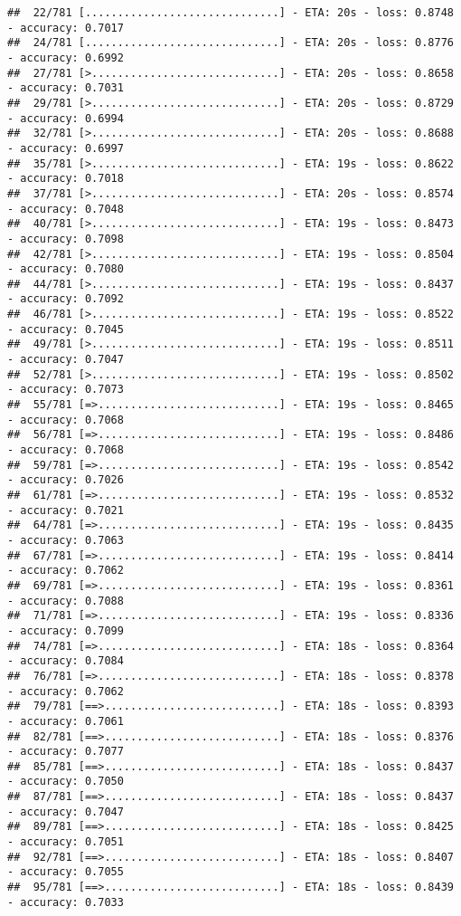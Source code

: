 \documentclass[
]{article}
\begin{document}
\begin{verbatim}
##  22/781 [..............................] - ETA: 20s - loss: 0.8748 - accuracy: 0.7017
##  24/781 [..............................] - ETA: 20s - loss: 0.8776 - accuracy: 0.6992
##  27/781 [>.............................] - ETA: 20s - loss: 0.8658 - accuracy: 0.7031
##  29/781 [>.............................] - ETA: 20s - loss: 0.8729 - accuracy: 0.6994
##  32/781 [>.............................] - ETA: 20s - loss: 0.8688 - accuracy: 0.6997
##  35/781 [>.............................] - ETA: 19s - loss: 0.8622 - accuracy: 0.7018
##  37/781 [>.............................] - ETA: 20s - loss: 0.8574 - accuracy: 0.7048
##  40/781 [>.............................] - ETA: 19s - loss: 0.8473 - accuracy: 0.7098
##  42/781 [>.............................] - ETA: 19s - loss: 0.8504 - accuracy: 0.7080
##  44/781 [>.............................] - ETA: 19s - loss: 0.8437 - accuracy: 0.7092
##  46/781 [>.............................] - ETA: 19s - loss: 0.8522 - accuracy: 0.7045
##  49/781 [>.............................] - ETA: 19s - loss: 0.8511 - accuracy: 0.7047
##  52/781 [>.............................] - ETA: 19s - loss: 0.8502 - accuracy: 0.7073
##  55/781 [=>............................] - ETA: 19s - loss: 0.8465 - accuracy: 0.7068
##  56/781 [=>............................] - ETA: 19s - loss: 0.8486 - accuracy: 0.7068
##  59/781 [=>............................] - ETA: 19s - loss: 0.8542 - accuracy: 0.7026
##  61/781 [=>............................] - ETA: 19s - loss: 0.8532 - accuracy: 0.7021
##  64/781 [=>............................] - ETA: 19s - loss: 0.8435 - accuracy: 0.7063
##  67/781 [=>............................] - ETA: 19s - loss: 0.8414 - accuracy: 0.7062
##  69/781 [=>............................] - ETA: 19s - loss: 0.8361 - accuracy: 0.7088
##  71/781 [=>............................] - ETA: 19s - loss: 0.8336 - accuracy: 0.7099
##  74/781 [=>............................] - ETA: 18s - loss: 0.8364 - accuracy: 0.7084
##  76/781 [=>............................] - ETA: 18s - loss: 0.8378 - accuracy: 0.7062
##  79/781 [==>...........................] - ETA: 18s - loss: 0.8393 - accuracy: 0.7061
##  82/781 [==>...........................] - ETA: 18s - loss: 0.8376 - accuracy: 0.7077
##  85/781 [==>...........................] - ETA: 18s - loss: 0.8437 - accuracy: 0.7050
##  87/781 [==>...........................] - ETA: 18s - loss: 0.8437 - accuracy: 0.7047
##  89/781 [==>...........................] - ETA: 18s - loss: 0.8425 - accuracy: 0.7051
##  92/781 [==>...........................] - ETA: 18s - loss: 0.8407 - accuracy: 0.7055
##  95/781 [==>...........................] - ETA: 18s - loss: 0.8439 - accuracy: 0.7033

\end{verbatim}
\end{document}
